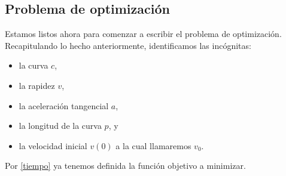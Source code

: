 \documentclass[a4paper,10pt]{book}
\begin{document}

 


\subsection{Problema de optimización}
Estamos listos ahora para comenzar a escribir el problema de optimización.
Recapitulando lo hecho anteriormente, identificamos las incógnitas:
\begin{itemize}
 \item la curva $c$,
 \item la rapidez $v$,
 \item la aceleración tangencial $a$,
 \item la longitud de la curva $p$, y
 \item la velocidad inicial $v(0)$ a la cual llamaremos $v_0$.
\end{itemize}

Por \eqref{tiempo} ya tenemos definida la función objetivo a minimizar.
\end{document}
